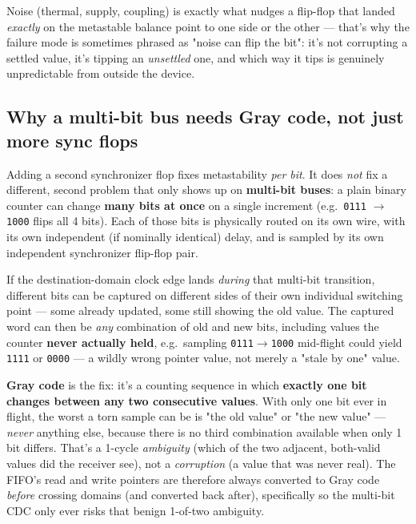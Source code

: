 \documentclass[12pt]{article}
\begin{document}
\begin{keybox}
Noise (thermal, supply, coupling) is exactly what nudges a flip-flop that
landed \emph{exactly} on the metastable balance point to one side or the
other — that's why the failure mode is sometimes phrased as "noise can
flip the bit": it's not corrupting a settled value, it's tipping an
\emph{unsettled} one, and which way it tips is genuinely unpredictable
from outside the device.
\end{keybox}

\subsection{Why a multi-bit bus needs Gray code, not just more sync flops}

Adding a second synchronizer flop fixes metastability \emph{per bit}. It
does \emph{not} fix a different, second problem that only shows up on
\textbf{multi-bit buses}: a plain binary counter can change \textbf{many
bits at once} on a single increment (e.g.\ \texttt{0111} $\to$
\texttt{1000} flips all 4 bits). Each of those bits is physically routed
on its own wire, with its own independent (if nominally identical) delay,
and is sampled by its own independent synchronizer flip-flop pair.

\begin{warnbox}
If the destination-domain clock edge lands \emph{during} that multi-bit
transition, different bits can be captured on different sides of their own
individual switching point — some already updated, some still showing the
old value. The captured word can then be \emph{any} combination of old and
new bits, including values the counter \textbf{never actually held}, e.g.\
sampling \texttt{0111}$\to$\texttt{1000} mid-flight could yield
\texttt{1111} or \texttt{0000} — a wildly wrong pointer value, not merely a
"stale by one" value.
\end{warnbox}

\textbf{Gray code} is the fix: it's a counting sequence in which
\textbf{exactly one bit changes between any two consecutive values}. With
only one bit ever in flight, the worst a torn sample can be is "the old
value" or "the new value" — \emph{never} anything else, because there is no
third combination available when only 1 bit differs. That's a 1-cycle
\emph{ambiguity} (which of the two adjacent, both-valid values did the
receiver see), not a \emph{corruption} (a value that was never real). The
FIFO's read and write pointers are therefore always converted to Gray code
\emph{before} crossing domains (and converted back after), specifically so
the multi-bit CDC only ever risks that benign 1-of-two ambiguity.
\end{document}
